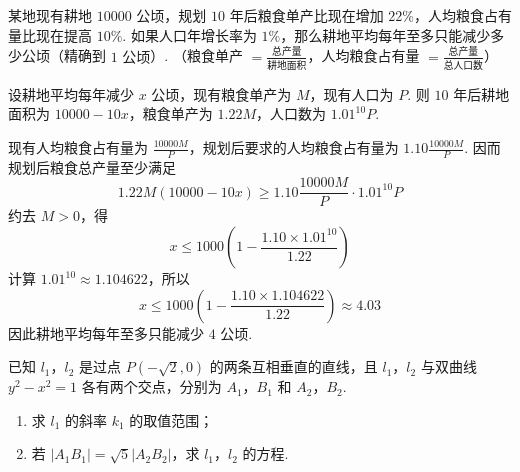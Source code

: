 \documentclass[UTF8,a4paper,oneside,11pt]{ctexbook}
\begin{document}
\begin{problem}
某地现有耕地 \(10000\text{ 公顷}\)，规划 \(10\) 年后粮食单产比现在增加 \(22\%\)，人均粮食占有量比现在提高 \(10\%\). 如果人口年增长率为 \(1\%\)，那么耕地平均每年至多只能减少多少公顷（精确到 \(1\text{ 公顷}\)）. （粮食单产 \(=\frac{\text{总产量}}{\text{耕地面积}}\)，人均粮食占有量 \(=\frac{\text{总产量}}{\text{总人口数}}\)）
\end{problem}

\begin{solution}
设耕地平均每年减少 \(x\) 公顷，现有粮食单产为 \(M\)，现有人口为 \(P\). 则 \(10\) 年后耕地面积为 \(10000-10x\)，粮食单产为 \(1.22M\)，人口数为 \(1.01^{10}P\).

现有人均粮食占有量为 \(\frac{10000M}{P}\)，规划后要求的人均粮食占有量为 \(1.10\frac{10000M}{P}\). 因而规划后粮食总产量至少满足
\[
1.22M(10000-10x)
\geqslant
1.10\frac{10000M}{P}\cdot1.01^{10}P
\]
约去 \(M>0\)，得
\[
x\leqslant1000\left(1-\frac{1.10\times1.01^{10}}{1.22}\right)
\]
计算 \(1.01^{10}\approx1.104622\)，所以
\[
x\leqslant1000\left(1-\frac{1.10\times1.104622}{1.22}\right)
\approx4.03
\]
因此耕地平均每年至多只能减少 \(4\) 公顷.
\end{solution}

\begin{problem}
已知 \(l_{1}\)，\(l_{2}\) 是过点 \(P(-\sqrt{2},0)\) 的两条互相垂直的直线，且 \(l_{1}\)，\(l_{2}\) 与双曲线 \(y^{2} - x^{2} = 1\) 各有两个交点，分别为 \(A_{1}\)，\(B_{1}\) 和 \(A_{2}\)，\(B_{2}\).

\begin{enumerate}
\item 求 \(l_{1}\) 的斜率 \(k_{1}\) 的取值范围；
\item 若 \(\left|A_{1}B_{1}\right|=\sqrt{5}\left|A_{2}B_{2}\right|\)，求 \(l_{1}\)，\(l_{2}\) 的方程.
\end{enumerate}
\end{problem}
\end{document}
